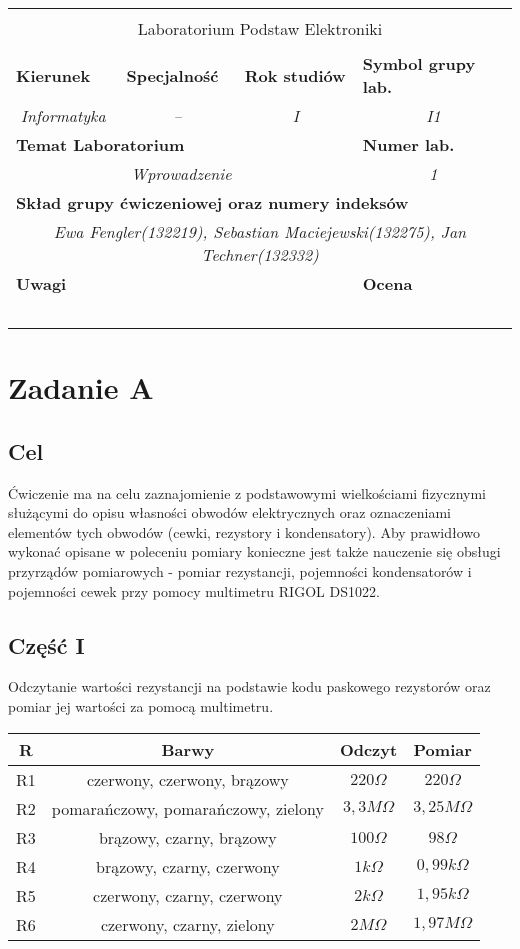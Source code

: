 \documentclass[polish,a4paper]{article}
\newcommand{\PRzFieldDsc}[1]{\sffamily\bfseries\scriptsize #1}
\newcommand{\PRzFieldCnt}[1]{\itshape #1}
\newcommand{\PRzHeading}[8]{

\begin{center}
\begin{tabular}{ p{0.32\textwidth} p{0.15\textwidth} p{0.15\textwidth} p{0.12\textwidth} p{0.12\textwidth} }

  &   &   &   &   \\
\hline
\multicolumn{5}{|c|}{}\\[-1ex]
\multicolumn{5}{|c|}{{\LARGE #1}}\\
\multicolumn{5}{|c|}{}\\[-1ex]

\hline
\multicolumn{1}{|l|}{\PRzFieldDsc{Kierunek}}	& \multicolumn{1}{|l|}{\PRzFieldDsc{Specjalność}}	& \multicolumn{1}{|l|}{\PRzFieldDsc{Rok studiów}}	& \multicolumn{2}{|l|}{\PRzFieldDsc{Symbol grupy lab.}} \\
\multicolumn{1}{|c|}{\PRzFieldCnt{#2}}		& \multicolumn{1}{|c|}{\PRzFieldCnt{#3}}		& \multicolumn{1}{|c|}{\PRzFieldCnt{#4}}		& \multicolumn{2}{|c|}{\PRzFieldCnt{#5}} \\

\hline
\multicolumn{4}{|l|}{\PRzFieldDsc{Temat Laboratorium}}		& \multicolumn{1}{|l|}{\PRzFieldDsc{Numer lab.}} \\
\multicolumn{4}{|c|}{\PRzFieldCnt{#6}}				& \multicolumn{1}{|c|}{\PRzFieldCnt{#7}} \\

\hline
\multicolumn{5}{|l|}{\PRzFieldDsc{Skład grupy ćwiczeniowej oraz numery indeksów}}\\
\multicolumn{5}{|c|}{\PRzFieldCnt{#8}}\\

\hline
\multicolumn{3}{|l|}{\PRzFieldDsc{Uwagi}}	& \multicolumn{2}{|l|}{\PRzFieldDsc{Ocena}} \\
\multicolumn{3}{|c|}{\PRzFieldCnt{\ }}		& \multicolumn{2}{|c|}{\PRzFieldCnt{\ }} \\

\hline
\end{tabular}
\end{center}
}
\begin{document}
\PRzHeading{Laboratorium Podstaw Elektroniki}{Informatyka}{--}{I}{I1}{Wprowadzenie}{1}{Ewa Fengler(132219), Sebastian Maciejewski(132275), Jan Techner(132332)}{}


\section{Zadanie A}

\subsection*{Cel}


Ćwiczenie ma na celu zaznajomienie z podstawowymi wielkościami fizycznymi służącymi do opisu własności obwodów elektrycznych oraz oznaczeniami elementów tych obwodów (cewki, rezystory i kondensatory). Aby prawidłowo wykonać opisane w poleceniu pomiary konieczne jest także nauczenie się obsługi przyrządów pomiarowych - pomiar rezystancji, pojemności kondensatorów i pojemności cewek przy pomocy multimetru RIGOL DS1022.

\subsection{Część I}
Odczytanie wartości rezystancji na podstawie kodu paskowego rezystorów oraz pomiar jej wartości za pomocą multimetru.\\

\begin{center}
\begin{tabular}{|c|c|c|c|}
\hline
\textbf{R} & \textbf{Barwy} & \textbf{Odczyt} & \textbf{Pomiar}\\
\hline
R1 & czerwony, czerwony, brązowy & $220\Omega$ & $220\Omega$\\
\hline
R2 & pomarańczowy, pomarańczowy, zielony & $3,3M\Omega$ & $3,25M\Omega$\\
\hline
R3 & brązowy, czarny, brązowy & $100\Omega$ & $98\Omega$\\
\hline
R4 & brązowy, czarny, czerwony & $1k\Omega$ & $0,99k\Omega$\\
\hline
R5 & czerwony, czarny, czerwony & $2k\Omega$ & $1,95k\Omega$\\
\hline
R6 & czerwony, czarny, zielony & $2M\Omega$ & $1,97M\Omega$\\
\hline
\end{tabular}
\end{center}
\end{document}
